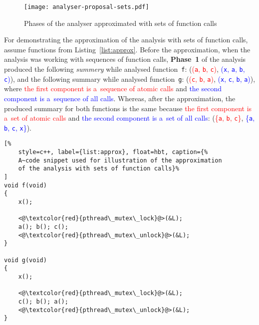 \begin{figure}[hbt]
    \centering
    \texttt{[image: analyser-proposal-sets.pdf]}
    \caption{Phases of the analyser approximated with sets of function calls}
    \label{fig:atomerProposalSets}
\end{figure}

\begin{example}
    For demonstrating the approximation of the analysis with sets of
    function calls, assume functions from Listing~\ref{list:approx}.
    Before the approximation, when the analysis was working with sequences
    of function calls, \textbf{Phase~1} of the analysis produced the
    following \emph{summery} while analysed function~\texttt{f}:
    (\textcolor{red}{(\texttt{a}, \texttt{b}, \texttt{c})}, \textcolor{blue}{%
    (\texttt{x}, \texttt{a}, \texttt{b}, \texttt{c})}), and the following
    summary while analysed function~\texttt{g}:
    (\textcolor{red}{(\texttt{c}, \texttt{b}, \texttt{a})}, \textcolor{blue}{%
    (\texttt{x}, \texttt{c}, \texttt{b}, \texttt{a})}), where
    \textcolor{red}{the first component is a~sequence of atomic calls}
    and \textcolor{blue}{the second component is a~sequence of all calls}.
    Whereas, after the approximation, the produced summary for both
    functions is the same because \textcolor{red}{the first component is
    a~set of atomic calls} and \textcolor{blue}{the second component is
    a~set of all calls}: (\textcolor{red}{\{\texttt{a}, \texttt{b},
    \texttt{c}\}}, \textcolor{blue}{\{\texttt{a}, \texttt{b}, \texttt{c},
    \texttt{x}\}}).
\end{example}

\begin{lstlisting}[%
    style=c++, label={list:approx}, float=hbt, caption={%
    A~code snippet used for illustration of the approximation
    of the analysis with sets of function calls}%
]
void f(void)
{
    x();

    <@\textcolor{red}{pthread\_mutex\_lock}@>(&L);
    a(); b(); c();
    <@\textcolor{red}{pthread\_mutex\_unlock}@>(&L);
}

void g(void)
{
    x();

    <@\textcolor{red}{pthread\_mutex\_lock}@>(&L);
    c(); b(); a();
    <@\textcolor{red}{pthread\_mutex\_unlock}@>(&L);
}
\end{lstlisting}

